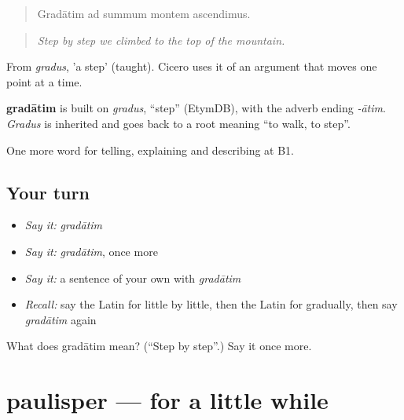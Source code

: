 \begin{quote}
Gradātim ad summum montem ascendimus.
\end{quote}

\begin{quote}
\emph{Step by step we climbed to the top of the mountain.}
\end{quote}

From \emph{gradus}, 'a step' (taught). Cicero uses it of an argument that moves one point at a time.

\begin{cousinweb}
\textbf{gradātim} is built on \emph{gradus}, \textquotedblleft{}step\textquotedblright{} (EtymDB), with the adverb ending \emph{-ātim}. \emph{Gradus} is inherited and goes back to a root meaning \textquotedblleft{}to walk, to step\textquotedblright{}.
\end{cousinweb}

\begin{grammarlens}[title={What you've built}]
One more word for telling, explaining and describing at B1.
\end{grammarlens}

\subsection*{Your turn}
\begin{itemize}
\raggedright
  \item \emph{Say it:} \emph{gradātim}
  \item \emph{Say it:} \emph{gradātim}, once more
  \item \emph{Say it:} a sentence of your own with \emph{gradātim}
  \item \emph{Recall:} say the Latin for little by little, then the Latin for gradually, then say \emph{gradātim} again
\end{itemize}

\begin{tcolorbox}[breakable,colback=teal!4,colframe=teal!35!black,title={Before you move on}]
What does gradātim mean? (\textquotedblleft{}Step by step\textquotedblright{}.) Say it once more.
\end{tcolorbox}
\section[paulisper]{paulisper — for a little while}

\label{lesson:LA-C293-paulisper}



